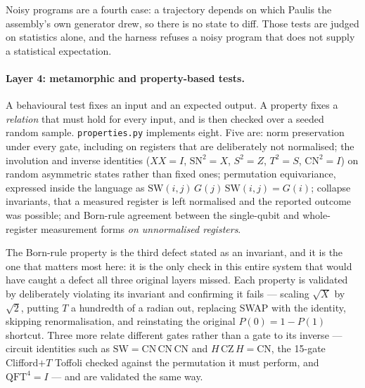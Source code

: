 \documentclass[11pt]{article}
\begin{document}
Noisy programs are a fourth case: a trajectory depends on which Paulis the assembly's own
generator drew, so there is no state to diff. Those tests are judged on statistics alone,
and the harness refuses a noisy program that does not supply a statistical expectation.

\paragraph{Layer 4: metamorphic and property-based tests.} A behavioural test fixes an
input and an expected output. A property fixes a \emph{relation} that must hold for every
input, and is then checked over a seeded random sample. \texttt{properties.py} implements
eight. Five are: norm preservation under every gate, including on registers that are deliberately not
normalised; the involution and inverse identities ($XX = I$, $\mathrm{SN}^2 = X$,
$S^2 = Z$, $T^2 = S$, $\mathrm{CN}^2 = I$) on random asymmetric states rather than fixed
ones; permutation equivariance, expressed inside the language as
$\mathrm{SW}(i,j)\,G(j)\,\mathrm{SW}(i,j) = G(i)$; collapse invariants, that a measured
register is left normalised and the reported outcome was possible; and Born-rule agreement
between the single-qubit and whole-register measurement forms \emph{on unnormalised
registers}.

The Born-rule property is the third defect stated as an invariant, and it is the one that
matters most here: it is the only check in this entire system that would have caught a
defect all three original layers missed. Each property is validated by deliberately
violating its invariant and confirming it fails --- scaling $\sqrt{X}$ by $\sqrt2$, putting
$T$ a hundredth of a radian out, replacing SWAP with the identity, skipping
renormalisation, and reinstating the original $P(0) = 1 - P(1)$ shortcut. Three more
relate different gates rather than a gate to its inverse --- circuit identities such as
$\mathrm{SW} = \mathrm{CN}\,\mathrm{CN}\,\mathrm{CN}$ and $H\,\mathrm{CZ}\,H = \mathrm{CN}$,
the 15-gate Clifford$+T$ Toffoli checked against the permutation it must perform, and
$\mathrm{QFT}^4 = I$ --- and are validated the same way.
\end{document}
